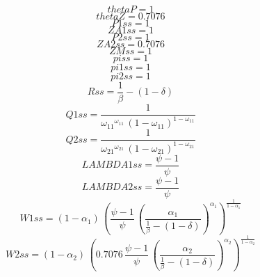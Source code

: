 \begin{dmath*}
thetaP = 1
\end{dmath*}
\begin{dmath*}
thetaZ = 0.7076
\end{dmath*}
\begin{dmath*}
P1ss = 1
\end{dmath*}
\begin{dmath*}
ZA1ss = 1
\end{dmath*}
\begin{dmath*}
P2ss = 1
\end{dmath*}
\begin{dmath*}
ZA2ss = 0.7076
\end{dmath*}
\begin{dmath*}
ZMss = 1
\end{dmath*}
\begin{dmath*}
piss = 1
\end{dmath*}
\begin{dmath*}
pi1ss = 1
\end{dmath*}
\begin{dmath*}
pi2ss = 1
\end{dmath*}
\begin{dmath*}
Rss = \frac{1}{{{\beta}}}-\left(1-{{\delta}}\right)
\end{dmath*}
\begin{dmath*}
Q1ss = \frac{1}{{{\omega_{11}}}^{{{\omega_{11}}}}\, \left(1-{{\omega_{11}}}\right)^{1-{{\omega_{11}}}}}
\end{dmath*}
\begin{dmath*}
Q2ss = \frac{1}{{{\omega_{21}}}^{{{\omega_{21}}}}\, \left(1-{{\omega_{21}}}\right)^{1-{{\omega_{21}}}}}
\end{dmath*}
\begin{dmath*}
LAMBDA1ss = \frac{{{\psi}}-1}{{{\psi}}}
\end{dmath*}
\begin{dmath*}
LAMBDA2ss = \frac{{{\psi}}-1}{{{\psi}}}
\end{dmath*}
\begin{dmath*}
W1ss = \left(1-{{\alpha_{1}}}\right)\, \left(\frac{{{\psi}}-1}{{{\psi}}}\, \left(\frac{{{\alpha_{1}}}}{\frac{1}{{{\beta}}}-\left(1-{{\delta}}\right)}\right)^{{{\alpha_{1}}}}\right)^{\frac{1}{1-{{\alpha_{1}}}}}
\end{dmath*}
\begin{dmath*}
W2ss = \left(1-{{\alpha_{2}}}\right)\, \left(0.7076\, \frac{{{\psi}}-1}{{{\psi}}}\, \left(\frac{{{\alpha_{2}}}}{\frac{1}{{{\beta}}}-\left(1-{{\delta}}\right)}\right)^{{{\alpha_{2}}}}\right)^{\frac{1}{1-{{\alpha_{2}}}}}
\end{dmath*}
